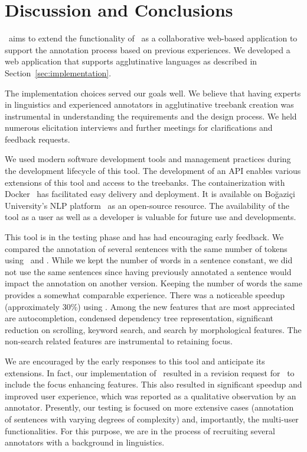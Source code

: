 \section{Discussion and Conclusions}
\label{sec:discussion}


\boatvtwo\ aims to extend the functionality of \boatvone\ as a collaborative web-based application to support the annotation process based on previous experiences.
We developed a web application that supports agglutinative languages as described in Section~\ref{sec:implementation}.

The implementation choices served our goals well.
We believe that having experts in linguistics and experienced annotators in agglutinative treebank creation was instrumental in understanding the requirements and the design process.
We held numerous elicitation interviews and further meetings for clarifications and feedback requests.

We used modern software development tools and management practices during the development lifecycle of this tool.
The development of an API enables various extensions of this tool and access to the treebanks.
The containerization with Docker~\cite{docker} has facilitated easy delivery and deployment.
It is available on Boğaziçi University's NLP platform~\cite{TULAP} as an open-source resource.
The availability of the tool as a user as well as a developer is valuable for future use and developments.

This tool is in the testing phase and has had encouraging early feedback.
We compared the annotation of several sentences with the same number of tokens using \boatvone\ and \boatvtwo.
While we kept the number of words in a sentence constant, we did not use the same sentences since having previously annotated a sentence would impact the annotation on another version.
Keeping the number of words the same provides a somewhat comparable experience.
There was a noticeable speedup (approximately 30\%) using \boatvtwo.
Among the new features that are most appreciated are autocompletion, condensed dependency tree representation, significant reduction on scrolling, keyword search, and search by morphological features.
The non-search related features are instrumental to retaining focus.

We are encouraged by the early responses to this tool and anticipate its extensions.
In fact, our implementation of \boatvtwo\ resulted in a revision request for \boatvone\ to include the focus enhancing features.
This also resulted in significant speedup and improved user experience, which was reported as a qualitative observation by an annotator.
Presently, our testing is focused on more extensive cases (annotation of sentences with varying degrees of complexity) and, importantly, the multi-user functionalities.
For this purpose, we are in the process of recruiting several annotators with a background in linguistics.
